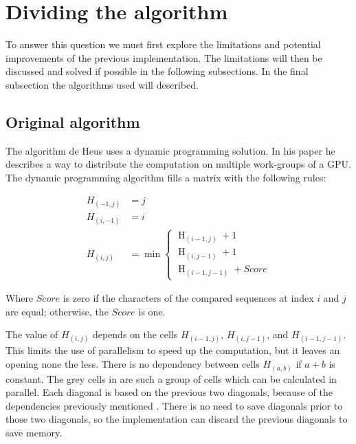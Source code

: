 \section{Dividing the algorithm} \label{q1}
To answer this question we must first explore the limitations and potential improvements of the previous implementation.
The limitations will then be discussed and solved if possible in the following subsections.
In the final subsection the algorithms used will described.

\subsection{Original algorithm}
The algorithm de Heus uses a dynamic programming solution\cite{Heus}.
In his paper he describes a way to distribute the computation on multiple work-groups of a GPU.
The dynamic programming algorithm fills a matrix with the following rules\cite{Jordan}:

\begin{equation} \label{eq1}
\begin{split}
H_{(-1,j)} & = j \\
H_{(i,-1)} & = i \\
H_{(i,j)} & = \min \begin{cases}
          \operatorname{H}_{(i-1,j)} + 1 \\
          \operatorname{H}_{(i,j-1)} + 1 \\
          \operatorname{H}_{(i-1,j-1)} + Score
\end{cases}
\end{split}
\end{equation}

Where $Score$ is zero if the characters of the compared sequences at index $i$ and $j$ are equal; otherwise, the $Score$ is one.

The value of $H_{(i,j)}$ depends on the cells $H_{(i-1,j)}$, $H_{(i,j-1)}$, and $H_{(i-1,j-1)}$.
This limits the use of parallelism to speed up the computation, but it leaves an opening none the less.
There is no dependency between cells $H_{(a,b)}$ if $a + b$ is constant.
The grey cells in  are such a group of cells which can be calculated in parallel.
Each diagonal is based on the previous two diagonals, because of the dependencies previously mentioned \cite{Meyers}.
There is no need to save diagonals prior to those two diagonals, so the implementation can discard the previous diagonals to save memory.


